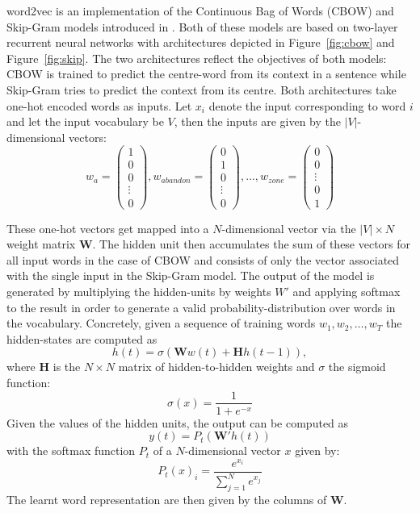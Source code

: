 \documentclass[conference]{IEEEtran}
\begin{document}
word2vec is an implementation of the Continuous Bag of Words (CBOW) and Skip-Gram
models introduced in \cite{mikolov2013efficient}. Both of these models are based
on  two-layer recurrent neural networks with architectures depicted in Figure~\ref{fig:cbow}
and Figure~\ref{fig:skip}. The two architectures reflect the objectives of both models: CBOW
is trained to predict the centre-word from its context in a sentence while Skip-Gram tries to predict
the context from its centre. Both architectures take one-hot encoded words as inputs. Let $x_i$
denote the input corresponding to word $i$ and let the input vocabulary be $V$, 
then the inputs are given by the $|V|$-dimensional vectors:
\begin{equation}
w_{a} = \begin{pmatrix}1 \\ 0 \\ 0 \\ \vdots \\ 0 \end{pmatrix},
w_{abandon} = \begin{pmatrix}0 \\ 1 \\ 0 \\ \vdots \\ 0 \end{pmatrix}, \dots ,
w_{zone} = \begin{pmatrix}0 \\ 0  \\ \vdots \\ 0 \\ 1 \end{pmatrix}
\end{equation}

These one-hot vectors get mapped into a $N$-dimensional vector via the $|V| \times N$ weight matrix
$\boldsymbol{W}$.  The hidden unit then accumulates the sum of these vectors for all input
words in the case of CBOW and consists of only the vector associated with the single input in the 
Skip-Gram model. The output of the model is generated by multiplying the hidden-units by
weights $W'$ and applying softmax to the result in order to generate a valid
probability-distribution over words in the vocabulary. Concretely, given a sequence of 
training words $w_1, w_2, \dots , w_T$ the hidden-states are computed as
\begin{equation}
	h(t) = \sigma (\boldsymbol{W}w(t) + \boldsymbol{H}h(t-1)),
\end{equation}
where $\boldsymbol{H}$ is the $N \times N$ matrix of hidden-to-hidden weights and 
$\sigma$ the sigmoid function:  
\begin{equation}
	\sigma (x) = \frac{1}{1+e^{-x}} 
\end{equation}
Given the values of the hidden units, the output can be computed as
\begin{equation}
	y(t) = P_t(\boldsymbol{W'}h(t))
\end{equation}
with the softmax function $P_t$ of a $N$-dimensional vector $x$ given by: 
\begin{equation}
	P_t(x)_i = \frac{e^{x_i}}{\sum_{j=1}^{N}{e^{x_j}}}
\end{equation}
The learnt word representation are then given by the columns of $\boldsymbol{W}$.
\end{document}
